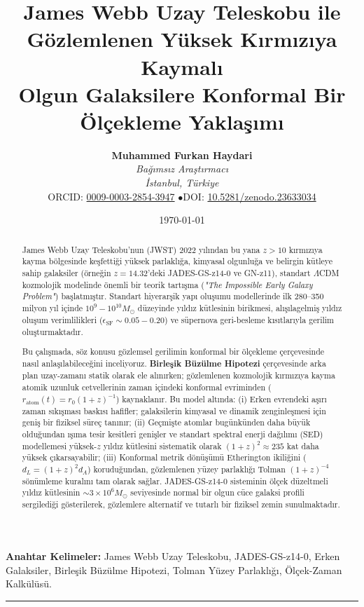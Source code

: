\documentclass[11pt,a4paper]{article}
\title{\textbf{James Webb Uzay Teleskobu ile Gözlemlenen Yüksek Kırmızıya Kaymalı \\ Olgun Galaksilere Konformal Bir Ölçekleme Yaklaşımı}}
\author{
    \textbf{Muhammed Furkan Haydari} \\
    \textit{Bağımsız Araştırmacı} \\
    \textit{İstanbul, Türkiye} \\
    \small ORCID: \href{https://orcid.org/0009-0003-2854-3947}{0009-0003-2854-3947} \quad$\bullet$\quad \small DOI: \href{https://doi.org/10.5281/zenodo.23633034}{10.5281/zenodo.23633034}
}
\date{\today}
\begin{document}
\maketitle

\begin{abstract}
    James Webb Uzay Teleskobu'nun (JWST) 2022 yılından bu yana $z > 10$ kırmızıya kayma bölgesinde keşfettiği yüksek parlaklığa, kimyasal olgunluğa ve belirgin kütleye sahip galaksiler (örneğin $z = 14.32$'deki JADES-GS-z14-0 ve GN-z11), standart $\Lambda$CDM kozmolojik modelinde önemli bir teorik tartışma (\textit{"The Impossible Early Galaxy Problem"}) başlatmıştır. Standart hiyerarşik yapı oluşumu modellerinde ilk 280--350 milyon yıl içinde $10^9 - 10^{10} M_\odot$ düzeyinde yıldız kütlesinin birikmesi, alışılagelmiş yıldız oluşum verimlilikleri ($\epsilon_{\mathrm{SF}} \sim 0.05 - 0.20$) ve süpernova geri-besleme kısıtlarıyla gerilim oluşturmaktadır.

    Bu çalışmada, söz konusu gözlemsel gerilimin konformal bir ölçekleme çerçevesinde nasıl anlaşılabileceğini inceliyoruz. \textbf{Birleşik Büzülme Hipotezi} çerçevesinde arka plan uzay-zamanı statik olarak ele alınırken; gözlemlenen kozmolojik kırmızıya kayma atomik uzunluk cetvellerinin zaman içindeki konformal evriminden ($r_{\mathrm{atom}}(t) = r_0 (1+z)^{-1}$) kaynaklanır. Bu model altında: (i) Erken evrendeki aşırı zaman sıkışması baskısı hafifler; galaksilerin kimyasal ve dinamik zenginleşmesi için geniş bir fiziksel süreç tanınır; (ii) Geçmişte atomlar bugünkünden daha büyük olduğundan ışıma tesir kesitleri genişler ve standart spektral enerji dağılımı (SED) modellemesi yüksek-$z$ yıldız kütlesini sistematik olarak $(1+z)^2 \approx 235$ kat daha yüksek çıkarsayabilir; (iii) Konformal metrik dönüşümü Etherington ikiliğini ($d_L = (1+z)^2 d_A$) koruduğundan, gözlemlenen yüzey parlaklığı Tolman $(1+z)^{-4}$ sönümleme kuralını tam olarak sağlar. JADES-GS-z14-0 sisteminin ölçek düzeltmeli yıldız kütlesinin $\sim 3 \times 10^6 M_\odot$ seviyesinde normal bir olgun cüce galaksi profili sergilediği gösterilerek, gözlemlere alternatif ve tutarlı bir fiziksel zemin sunulmaktadır.
\end{abstract}

\vspace{1em}
\noindent\textbf{Anahtar Kelimeler:} James Webb Uzay Teleskobu, JADES-GS-z14-0, Erken Galaksiler, Birleşik Büzülme Hipotezi, Tolman Yüzey Parlaklığı, Ölçek-Zaman Kalkülüsü.

\vspace{1em}
\hrule
\vspace{1.5em}
\end{document}
